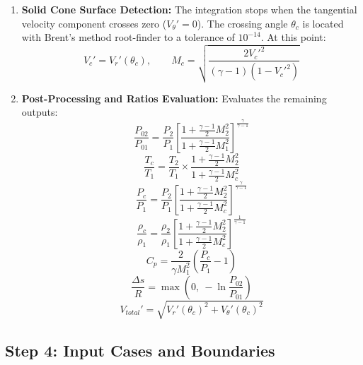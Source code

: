 \begin{enumerate}
    \item \textbf{Solid Cone Surface Detection:} The integration stops when the tangential velocity component crosses zero ($V_\theta' = 0$). The crossing angle $\theta_c$ is located with Brent's method root-finder to a tolerance of $10^{-14}$. At this point:
    \begin{equation}
    V_c' = V_r'(\theta_c), \qquad M_c = \sqrt{\frac{2V_c'^2}{(\gamma-1)(1-V_c'^2)}}
    \end{equation}

    \item \textbf{Post-Processing and Ratios Evaluation:} Evaluates the remaining outputs:
    \begin{equation}
    \frac{P_{02}}{P_{01}} = \frac{P_2}{P_1}\left[\frac{1+\frac{\gamma-1}{2}M_2^2}{1+\frac{\gamma-1}{2}M_1^2}\right]^{\frac{\gamma}{\gamma-1}}
    \end{equation}
    \begin{equation}
    \frac{T_c}{T_1} = \frac{T_2}{T_1}\times\frac{1+\frac{\gamma-1}{2}M_2^2}{1+\frac{\gamma-1}{2}M_c^2}
    \end{equation}
    \begin{equation}
    \frac{P_c}{P_1} = \frac{P_2}{P_1}\left[\frac{1+\frac{\gamma-1}{2}M_2^2}{1+\frac{\gamma-1}{2}M_c^2}\right]^{\frac{\gamma}{\gamma-1}}
    \end{equation}
    \begin{equation}
    \frac{\rho_c}{\rho_1} = \frac{\rho_2}{\rho_1}\left[\frac{1+\frac{\gamma-1}{2}M_2^2}{1+\frac{\gamma-1}{2}M_c^2}\right]^{\frac{1}{\gamma-1}}
    \end{equation}
    \begin{equation}
    C_p = \frac{2}{\gamma M_1^2}\left(\frac{P_c}{P_1}-1\right)
    \end{equation}
    \begin{equation}
    \frac{\Delta s}{R} = \max\left(0,\ -\ln\frac{P_{02}}{P_{01}}\right)
    \end{equation}
    \begin{equation}
    V_{total}' = \sqrt{V_r'(\theta_c)^2+V_\theta'(\theta_c)^2}
    \end{equation}
\end{enumerate}

\subsection*{Step 4: Input Cases and Boundaries}

